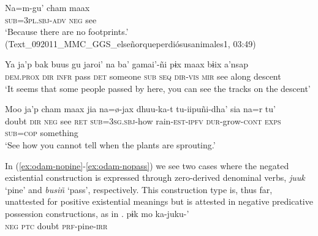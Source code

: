 \documentclass[output=paper]{langsci/langscibook}
\begin{document}

\ea
\label{ex:odam-footprints}
\gll Na=m-gu' 			cham 	maax\\
\textsc{sub=3pl.sbj-adv}	\textsc{neg} 	see\\
\glt ‘Because there are no footprints.’ (Text\_092011\_MMC\_GGS\_elseñorqueperdiósusanimales1, 03:49)
\z 
\ea
\label{ex:odam-aandb}
\begin{xlist}
\item\label{ex:odam-possee}\gll Ya	ja’p	bak	buus	gu	jaroi’		na	ba’	gamai’-ñi pɨx	maax	bɨix	a’nsap\\
	\textsc{dem.prox}	\textsc{dir}	\textsc{infr}	pass	\textsc{det}	someone	\textsc{sub}	\textsc{seq}	\textsc{dir-vis} \textsc{mir}	see	along	descent\\
\glt ‘It seems that some people passed by here, you can see the tracks on the descent’ \citep[120]{willettw2015}
\item\label{ex:odam-negsee}\gll Moo 	ja’p 	cham 	maax	jia 	na=\o-jax 	dhuu-ka-t 	tu-iipuñi-dha’		sia 	na=r tu’\\
doubt	\textsc{dir}	\textsc{neg}	see	\textsc{ret}	\textsc{sub=3sg.sbj}-how	rain-\textsc{est-ipfv}	\textsc{dur}-grow-\textsc{cont}	\textsc{exps}	\textsc{sub=cop} something\\
\glt ‘See how you cannot tell when the plants are sprouting.’ \citep[120]{willettw2015}

\end{xlist}
\z 
In (\ref{ex:odam-nopine}-\ref{ex:odam-nopass}) we see two cases where the negated existential construction is expressed through zero-derived denominal verbs, \emph{juuk} ‘pine’ and \emph{busiñ} ‘pass’, respectively. This construction type is, thus far, unattested for positive existential meanings but is attested in negative predicative possession constructions, as in . 
\ea
\label{ex:odam-nopine}
 	pɨk 	mo 	ka-juku-'\\
\textsc{neg}		\textsc{ptc}	doubt	\textsc{prf}-pine-\textsc{irr}\\
\end{document}
